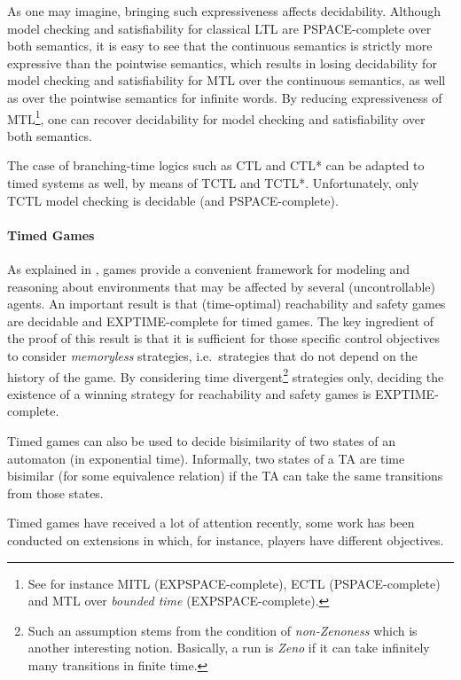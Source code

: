 \documentclass[11pt]{article}
\theoremstyle{definition}
\theoremstyle{remark}
\theoremstyle{definition}
\begin{document}
As one may imagine, bringing such expressiveness affects decidability. Although model checking and satisfiability for classical LTL are PSPACE-complete over both semantics, it is easy to see that the continuous semantics is strictly more expressive than the pointwise semantics, which results in losing decidability for model checking and satisfiability for MTL over the continuous semantics, as well as over the pointwise semantics for infinite words. By reducing expressiveness of MTL\footnote{See for instance MITL (EXPSPACE-complete), ECTL (PSPACE-complete) and MTL over \emph{bounded time} (EXPSPACE-complete).}, one can recover decidability for model checking and satisfiability over both semantics.

The case of branching-time logics such as CTL and CTL* can be adapted to timed systems as well, by means of TCTL and TCTL*. Unfortunately, only TCTL model checking is decidable (and PSPACE-complete).

\paragraph{Timed Games}\label{par:timedgames}
As explained in \cite[Chapter 27]{handbook}, games provide a convenient framework for modeling and reasoning about environments that may be affected by several (uncontrollable) agents.
An important result is that (time-optimal) reachability and safety games are decidable and EXPTIME-complete for timed games.
The key ingredient of the proof of this result is that it is sufficient for those specific control objectives to consider \emph{memoryless} strategies, i.e.\ strategies that do not depend on the history of the game.
By considering time divergent\footnote{Such an assumption stems from the condition of \emph{non-Zenoness} which is another interesting notion. Basically, a run is \emph{Zeno} if it can take infinitely many transitions in finite time.} strategies only, deciding the existence of a winning strategy for reachability and safety games is EXPTIME-complete.

Timed games can also be used to decide bisimilarity of two states of an automaton (in exponential time).
Informally, two states of a TA are time bisimilar (for some equivalence relation) if the TA can take the same transitions from those states.

Timed games have received a lot of attention recently, some work has been conducted on extensions in which, for instance, players have different objectives.
\end{document}
